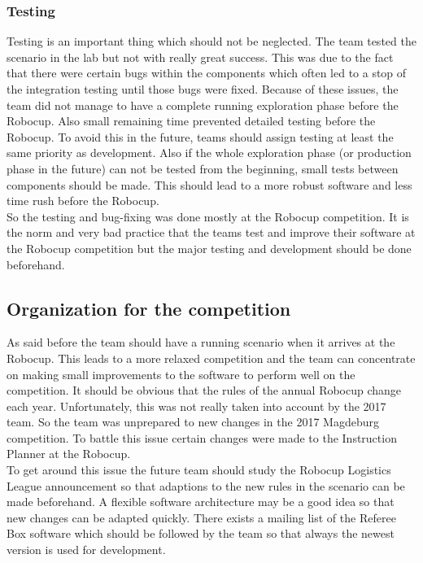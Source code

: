\subsubsection{Testing}

Testing is an important thing which should not be neglected. The team tested the scenario in the lab but not with really great success. This was due to the fact that there were certain bugs within the components which often led to a stop of the integration testing until those bugs were fixed. Because of these issues, the team did not manage to have a complete running exploration phase before the Robocup. Also small remaining time prevented detailed testing before the Robocup. To avoid this in the future, teams should assign testing at least the same priority as development. Also if the whole exploration phase (or production phase in the future) can not be tested from the beginning, small tests between components should be made. This should lead to a more robust software and less time rush before the Robocup. \\

So the testing and bug-fixing was done mostly at the Robocup competition. It is the norm and very bad practice that the teams test and improve their software at the Robocup competition but the major testing and development should be done beforehand. 

 
\subsection{Organization for the competition}
 
As said before the team should have a running scenario when it arrives at the Robocup. This leads to a more relaxed competition and the team can concentrate on making small improvements to the software to perform well on the competition. It should be obvious that the rules of the annual Robocup change each year. Unfortunately, this was not really taken into account by the 2017 team. So the team was unprepared to new changes in the 2017 Magdeburg competition. To battle this issue certain changes were made to the Instruction Planner at the Robocup.  \\

To get around this issue the future team should study the Robocup Logistics League announcement so that adaptions to the new rules in the scenario can be made beforehand. A flexible software architecture may be a good idea so that new changes can be adapted quickly. There exists a mailing list of the Referee Box software which should be followed by the team so that always the newest version is used for development. \\

